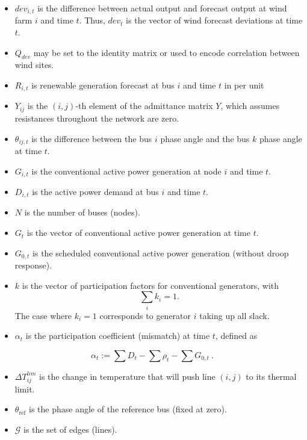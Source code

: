 \documentclass[conference]{IEEEtran}
\begin{document}
\begin{itemize}
\itemsep1pt\parskip0pt
\item $dev_{i,t}$ is the difference between actual output and forecast output at wind farm $i$ and time $t$. Thus, $dev_t$ is the vector of wind forecast deviations at time $t$.
\item $Q_{dev}$ may be set to the identity matrix or used to encode correlation between wind sites.
\item $R_{i,t}$ is renewable generation forecast at bus $i$ and time $t$ in per unit 
\item $Y_{ij}$ is the $(i,j)$-th element of the admittance matrix $Y$, which
  assumes resistances throughout the network are zero.
\item $\theta_{ij,t}$ is the difference between the bus $i$ phase angle and the bus $k$ phase angle at time $t$.
\item $G_{i,t}$ is the conventional active power generation at node $i$ and time $t$.
\item $D_{i,t}$ is the active power demand at bus $i$ and time $t$.
\item $N$ is the number of buses (nodes).
\item $G_t$ is the vector of conventional active power generation at time $t$.
\item $G_{0,t}$ is the scheduled conventional active power generation (without droop response).
\item $k$ is the vector of participation factors for conventional
  generators, with
\begin{equation}
\label{I:part} \sum_i k_i = 1.
\end{equation}
The case where $k_i=1$ corresponds to generator $i$ taking up all
  slack.
\item $\alpha_t$ is the participation coefficient (mismatch) at time $t$, defined as
\end{itemize}
\[\alpha_t:= \sum D_t - \sum \rho_t - \sum G_{0,t} ~.\]

\begin{itemize}
\itemsep1pt\parskip0pt
\item $\Delta T_{ij}^{lim}$ is the change in temperature that will push line $(i,j)$ to its thermal limit.
\item $\theta_\text{ref}$ is the phase angle of the reference bus (fixed at zero).
\item $\mathcal{G}$ is the set of edges (lines).
\end{itemize}
\end{document}
